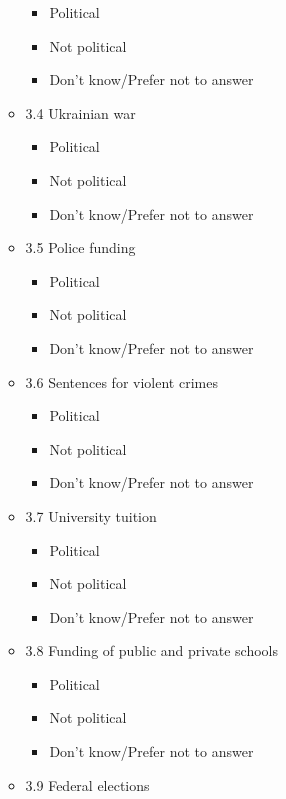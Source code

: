 \documentclass[
  letterpaper,
  DIV=11,
  numbers=noendperiod]{scrreprt}
\providecommand{\tightlist}{%
  \setlength{\itemsep}{0pt}\setlength{\parskip}{0pt}}\usepackage{longtable,booktabs,array}
\begin{document}
\begin{enumerate}
\begin{itemize}
    \begin{itemize}
    \tightlist
    \item
      Political
    \item
      Not political
    \item
      Don't know/Prefer not to answer
    \end{itemize}
  \item
    3.4 Ukrainian war

    \begin{itemize}
    \tightlist
    \item
      Political
    \item
      Not political
    \item
      Don't know/Prefer not to answer
    \end{itemize}
  \item
    3.5 Police funding

    \begin{itemize}
    \tightlist
    \item
      Political
    \item
      Not political
    \item
      Don't know/Prefer not to answer
    \end{itemize}
  \item
    3.6 Sentences for violent crimes

    \begin{itemize}
    \tightlist
    \item
      Political
    \item
      Not political
    \item
      Don't know/Prefer not to answer
    \end{itemize}
  \item
    3.7 University tuition

    \begin{itemize}
    \tightlist
    \item
      Political
    \item
      Not political
    \item
      Don't know/Prefer not to answer
    \end{itemize}
  \item
    3.8 Funding of public and private schools

    \begin{itemize}
    \tightlist
    \item
      Political
    \item
      Not political
    \item
      Don't know/Prefer not to answer
    \end{itemize}
  \item
    3.9 Federal elections


\end{itemize}
\end{enumerate}
\end{document}
